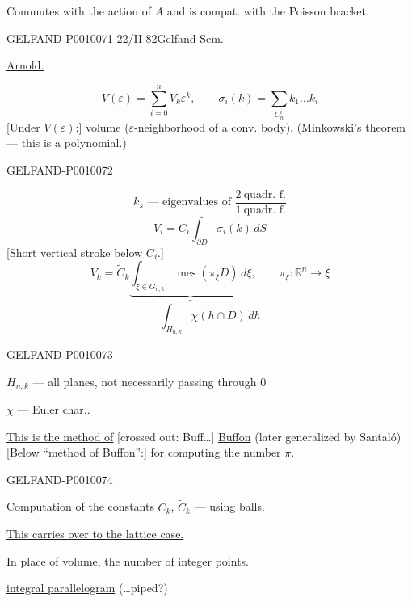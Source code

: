 Commutes with the action of $A$ and is compat. with the Poisson bracket.

\begin{flushright}\end{flushright}


\begin{GelfandAdjacentEvidence}{GELFAND-P001007}{1}
\underline{22/II-82}\qquad \underline{Gelfand Sem.}

\underline{Arnold.}

\[
V(\varepsilon)=\sum_{i=0}^{n}V_k\varepsilon^k,\qquad
\sigma_i(k)=\sum_{C_n^i}k_1\ldots k_i
\]
[Under $V(\varepsilon)$:] volume ($\varepsilon$-neighborhood of a conv. body). \quad (Minkowski’s theorem --- this is a polynomial.)
\end{GelfandAdjacentEvidence}
\begin{GelfandAdjacentEvidence}{GELFAND-P001007}{2}


\[
k_s\text{ --- eigenvalues of }\frac{2\ \text{quadr. f.}}{1\ \text{quadr. f.}}
\]
\[
V_i=C_i\int_{\partial D}\sigma_i(k)\,dS
\]
[Short vertical stroke below $C_i$.]
\[
V_k=\widetilde C_k
\underbrace{\int_{\xi\in G_{n,k}}\operatorname{mes}(\pi_\xi D)\,d\xi}_{\text{''}},
\qquad \pi_\xi\colon \mathbb R^n\longrightarrow\xi
\]
\[
\int_{H_{n,k}}\chi(h\cap D)\,dh
\]
\end{GelfandAdjacentEvidence}
\begin{GelfandAdjacentEvidence}{GELFAND-P001007}{3}


$H_{n,k}$ --- all planes, not necessarily passing through $0$

$\chi$ --- Euler char..

\underline{This is the method of} [crossed out: Buff\ldots] \underline{Buffon} (later generalized by Santaló)
[Below “method of Buffon”:] for computing the number $\pi$.
\end{GelfandAdjacentEvidence}
\begin{GelfandAdjacentEvidence}{GELFAND-P001007}{4}


Computation of the constants $C_k$, $\widetilde C_k$ --- using balls.

\underline{This carries over to the lattice case.}

In place of volume, the number of integer points.

\underline{integral parallelogram} (\ldots piped?)
\end{GelfandAdjacentEvidence}
